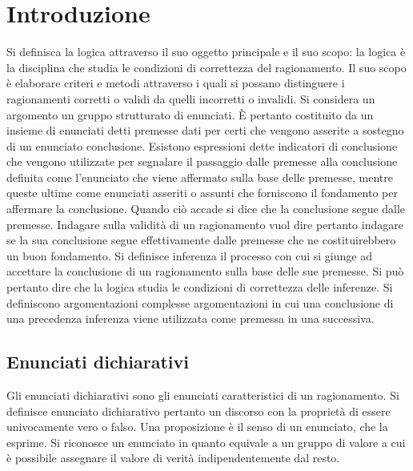 \chapter{Introduzione}
Si definisca la logica attraverso il suo oggetto principale e il suo scopo: la logica \`e la disciplina che studia le condizioni di correttezza del ragionamento. Il suo scopo \`e elaborare criteri e metodi attraverso i 
quali si possano distinguere i ragionamenti corretti o validi da quelli incorretti o invalidi. Si considera un argomento un gruppo strutturato di enunciati. \`E pertanto costituito da un insieme di enunciati detti 
premesse dati per certi che vengono asserite a sostegno di un enunciato conclusione. Esistono espressioni dette indicatori di conclusione che vengono utilizzate per segnalare il passaggio dalle premesse alla 
conclusione definita come l'enunciato che viene affermato sulla base delle premesse, mentre queste ultime come enunciati asseriti o assunti che forniscono il fondamento per affermare la conclusione. Quando 
ci\`o accade si dice che la conclusione segue dalle premesse. Indagare sulla validit\`a di un ragionamento vuol dire pertanto indagare se la sua conclusione segue effettivamente dalle premesse che ne 
costituirebbero un buon fondamento. Si definisce inferenza il processo con cui si giunge ad accettare la conclusione di un ragionamento sulla base delle sue premesse. Si pu\`o pertanto dire che la logica studia le 
condizioni di correttezza delle inferenze. Si definiscono argomentazioni complesse argomentazioni in cui una conclusione di una precedenza inferenza viene utilizzata come premessa in una successiva. 
\section{Enunciati dichiarativi}
Gli enunciati dichiarativi sono gli enunciati caratteristici di un ragionamento. Si definisce enunciato dichiarativo pertanto un discorso con la propriet\`a di essere univocamente vero o falso. Una proposizione \`e il 
senso di un enunciato, che la esprime. Si riconosce un enunciato in quanto equivale a un gruppo di valore a cui \`e possibile assegnare il valore di verit\`a indipendentemente dal resto. 
